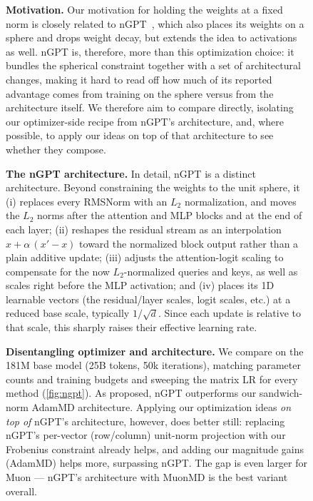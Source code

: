 \documentclass[10pt]{article} %
\makeatletter
\def\section{\@startsection{section}{1}{\z@}{-2.0ex plus -0.5ex minus -.2ex}{1.0ex plus 0.2ex minus 0.1ex}{\large\bf\raggedright\sffamily}}
\makeatother
\begin{document}
\begin{figure}[t]
\section{Comparison to nGPT}
\label{sec:appendix-ngpt}

\textbf{Motivation.} Our motivation for holding the weights at a fixed norm is closely related to nGPT~\citep{loshchilov2024ngpt}, which also places its weights on a sphere and drops weight decay, but extends the idea to activations as well. nGPT is, therefore, more than this optimization choice: it bundles the spherical constraint together with a set of architectural changes, making it hard to read off how much of its reported advantage comes from training on the sphere versus from the architecture itself. We therefore aim to compare directly, isolating our optimizer-side recipe from nGPT's architecture, and, where possible, to apply our ideas on top of that architecture to see whether they compose.

\textbf{The nGPT architecture.} In detail, nGPT is a distinct architecture. Beyond constraining the weights to the unit sphere, it (i) replaces every RMSNorm with an $L_2$ normalization, and moves the $L_2$ norms after the attention and MLP blocks and at the end of each layer; (ii) reshapes the residual stream as an interpolation $x + \alpha\,(x' - x)$ toward the normalized block output rather than a plain additive update; (iii) adjusts the attention-logit scaling to compensate for the now $L_2$-normalized queries and keys, as well as scales right before the MLP activation; and (iv) places its 1D learnable vectors (the residual/layer scales, logit scales, etc.) at a reduced base scale, typically $1/\sqrt{d}$. Since each update is relative to that scale, this sharply raises their effective learning rate.

\textbf{Disentangling optimizer and architecture.} We compare on the 181M base model (25B tokens, 50k iterations), matching parameter counts and training budgets and sweeping the matrix LR for every method (\autoref{fig:ngpt}). As proposed, nGPT outperforms our sandwich-norm AdamMD architecture. Applying our optimization ideas \emph{on top of} nGPT's architecture, however, does better still: replacing nGPT's per-vector (row/column) unit-norm projection with our Frobenius constraint already helps, and adding our magnitude gains (AdamMD) helps more, surpassing nGPT. The gap is even larger for Muon --- nGPT's architecture with MuonMD is the best variant overall.


\end{figure}
\end{document}
